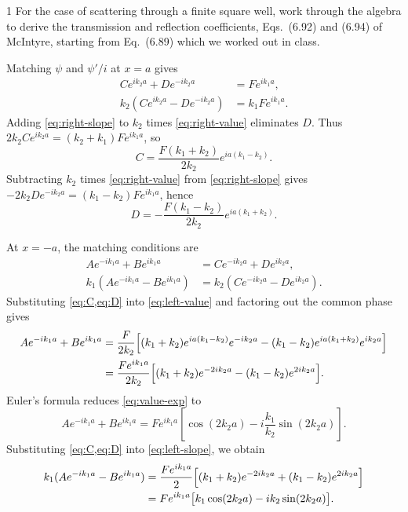 \documentclass[11pt]{article}
\begin{document}
\begin{problem}{1}
For the case of scattering through a finite square well, work through the algebra to derive the transmission and reflection coefficients, Eqs.~(6.92) and (6.94) of McIntyre, starting from Eq.~(6.89) which we worked out in class.
\end{problem}
\begin{answer}
Matching \(\psi\) and \(\psi'/i\) at \(x=a\) gives
\begin{align}
  Ce^{ik_2a}+De^{-ik_2a} &= Fe^{ik_1a}, \label{eq:right-value}\\
  k_2(Ce^{ik_2a}-De^{-ik_2a}) &= k_1Fe^{ik_1a}. \label{eq:right-slope}
\end{align}
Adding \cref{eq:right-slope} to \(k_2\) times \cref{eq:right-value}
eliminates \(D\). Thus \(2k_2Ce^{ik_2a}=(k_2+k_1)Fe^{ik_1a}\), so
\begin{equation}
  C=\frac{F(k_1+k_2)}{2k_2}e^{ia(k_1-k_2)}. \label{eq:C}
\end{equation}
Subtracting \(k_2\) times \cref{eq:right-value} from \cref{eq:right-slope} gives
\(-2k_2De^{-ik_2a}=(k_1-k_2)Fe^{ik_1a}\), hence
\begin{equation}
  D=-\frac{F(k_1-k_2)}{2k_2}e^{ia(k_1+k_2)}. \label{eq:D}
\end{equation}

At \(x=-a\), the matching conditions are
\begin{align}
  Ae^{-ik_1a}+Be^{ik_1a} &= Ce^{-ik_2a}+De^{ik_2a}, \label{eq:left-value}\\
  k_1(Ae^{-ik_1a}-Be^{ik_1a}) &= k_2(Ce^{-ik_2a}-De^{ik_2a}). \label{eq:left-slope}
\end{align}
Substituting \cref{eq:C,eq:D} into \cref{eq:left-value} and factoring
out the common phase gives
\begin{align}
  Ae^{-ik_1a}+Be^{ik_1a}
  &=\frac{F}{2k_2}\Big[(k_1+k_2)e^{ia(k_1-k_2)}e^{-ik_2a}
     -(k_1-k_2)e^{ia(k_1+k_2)}e^{ik_2a}\Big] \notag\\
  &=\frac{Fe^{ik_1a}}{2k_2}\Big[(k_1+k_2)e^{-2ik_2a}
      -(k_1-k_2)e^{2ik_2a}\Big]. \label{eq:value-exp}
\end{align}
Euler's formula reduces \cref{eq:value-exp} to
\begin{equation}
  Ae^{-ik_1a}+Be^{ik_1a}
  =Fe^{ik_1a}\left[\cos(2k_2a)-i\frac{k_1}{k_2}\sin(2k_2a)\right].
  \label{eq:value}
\end{equation}
Substituting \cref{eq:C,eq:D} into \cref{eq:left-slope}, we obtain
\begin{align}
  k_1(Ae^{-ik_1a}-Be^{ik_1a})
  &=\frac{Fe^{ik_1a}}{2}\Big[(k_1+k_2)e^{-2ik_2a}
     +(k_1-k_2)e^{2ik_2a}\Big] \notag\\
  &=Fe^{ik_1a}\big[k_1\cos(2k_2a)-ik_2\sin(2k_2a)\big].
  \label{eq:slope}
\end{align}


\end{answer}
\end{document}
